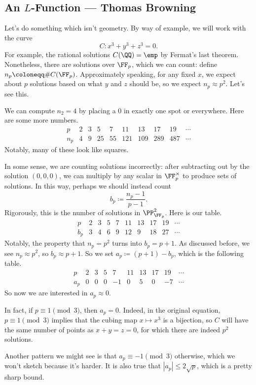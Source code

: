 \documentclass{article}
\begin{document}
\subsection{An \texorpdfstring{$L$}{ L}-Function --- Thomas Browning}
Let's do something which isn't geometry. By way of example, we will work with the curve
\[C\colon x^3+y^3+z^3=0.\]
For example, the rational solutions $C(\QQ)=\emp$ by Fermat's last theorem. Nonetheless, there are solutions over $\FF_p$, which we can count: define $n_p\coloneqq\#C(\FF_p)$. Approximately speaking, for any fixed $x$, we expect about $p$ solutions based on what $y$ and $z$ should be, so we expect $n_p\approx p^2$. Let's see this.
\begin{example}
	We can compute $n_2=4$ by placing a $0$ in exactly one spot or everywhere. Here are some more numbers.
	\[\begin{array}{c|ccccccccccc}
		p & 2 & 3 & 5 & 7 & 11 & 13 & 17 & 19 & \cdots \\\hline
		n_p & 4 & 9 & 25 & 55 & 121 & 109 & 289 & 487 & \cdots
	\end{array}\]
	Notably, many of these look like squares.
\end{example}
In some sense, we are counting solutions incorrectly: after subtracting out by the solution $(0,0,0)$, we can multiply by any scalar in $\FF_p^\times$ to produce sets of solutions. In this way, perhaps we should instead count
\[b_p\coloneqq\frac{n_p-1}{p-1}.\]
Rigorously, this is the number of solutions in $\PP^2_{\FF_p}$. Here is our table.
\[\begin{array}{c|ccccccccccc}
	p & 2 & 3 & 5 & 7 & 11 & 13 & 17 & 19 & \cdots \\\hline
	b_p & 3 & 4 & 6 & 9 & 12 & 9 & 18 & 27 & \cdots
\end{array}\]
Notably, the property that $n_p=p^2$ turns into $b_p=p+1$. As discussed before, we see $n_p\approx p^2$, so $b_p\approx p+1$. So we set $a_p\coloneqq(p+1)-b_p$, which is the following table.
\[\begin{array}{c|ccccccccccc}
	p & 2 & 3 & 5 & 7 & 11 & 13 & 17 & 19 & \cdots \\\hline
	a_p & 0 & 0 & 0 & -1 & 0 & 5 & 0 & -7 & \cdots
\end{array}\]
So now we are interested in $a_p\approx0$.
\begin{remark}
	In fact, if $p\equiv1\pmod3$, then $a_p=0$. Indeed, in the original equation, $p\equiv1\pmod3$ implies that the cubing map $x\mapsto x^3$ is a bijection, so $C$ will have the same number of points as $x+y=z=0$, for which there are indeed $p^2$ solutions.
\end{remark}
Another pattern we might see is that $a_p\equiv-1\pmod3$ otherwise, which we won't sketch because it's harder. It is also true that $|a_p|\le2\sqrt p$, which is a pretty sharp bound.
\end{document}
